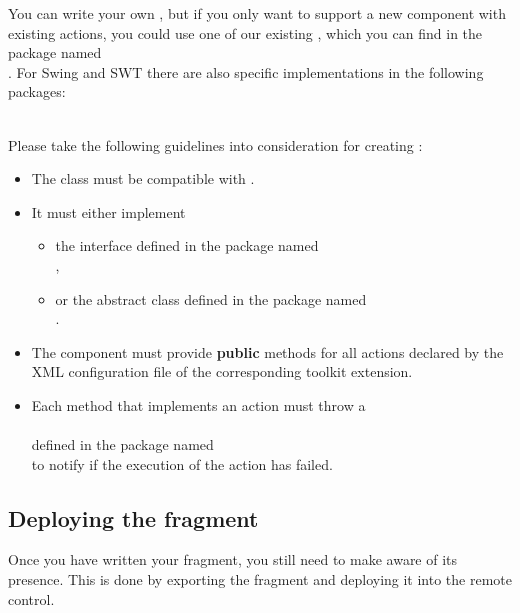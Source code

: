 You can write your own \gdtesterclasses, but if you only want to support a new
component with existing actions, you could use one of our existing
\gdtesterclasses, which you can find in the package named\\
. For Swing and SWT there are also
specific implementations in the following packages:\\
\\

Please take the following guidelines into consideration for creating
\gdtesterclasses:
\begin{itemize}
  \item The class must be compatible with .
  \item It must either implement
  \begin{itemize}
    \item the interface  defined in the package named\\
        ,\\
	 \item or the abstract class 
	     defined in the package named\\
	     .
  \end{itemize}
  \item The component must provide \textbf{public} methods for all actions
        declared by the XML configuration file of the corresponding \ite{}
        toolkit extension.
  \item Each method that implements an action must throw a\\
        \\
        defined in the package named\\
        to notify \app{} if the execution of the action has  failed.
\end{itemize}

\subsection{Deploying the fragment}

Once you have written your fragment, you still need to make \app{}
aware of its presence. This is done by exporting the fragment and
deploying it into the \app{} remote control.

